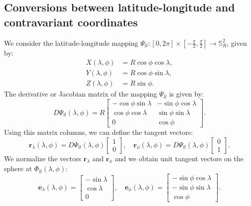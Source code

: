 \subsection{Conversions between latitude-longitude and contravariant coordinates}
\label{anexo-sph-ll}
We consider the latitude-longitude mapping 
$\Psi_{ll}: [0,2\pi] \times [-\frac{\pi}{2},\frac{\pi}{2}] \to \mathbb{S}^2_R$, given by:
\begin{align}
	\label{ll2sph}
	X(\lambda,\phi) &= R\cos \phi \cos \lambda,\\
	Y(\lambda,\phi) &= R\cos \phi \sin \lambda,\\
	Z(\lambda,\phi) &= R\sin \phi.
\end{align}
The derivative or Jacobian matrix of the mapping $\Psi_{ll}$ is given by:
\begin{equation}
	\label{dpsi}
	D\Psi_{ll} (\lambda,\phi) = 
	R \begin{bmatrix}
		  -\cos \phi \sin \lambda &  -\sin \phi \cos \lambda \\
		   \cos \phi \cos \lambda & \sin \phi \sin \lambda \\
		  0  &  \cos \phi
	\end{bmatrix}.
\end{equation}
Using this matrix columns, we can define the tangent vectors:
\begin{equation}
	\boldsymbol{r}_{\lambda}(\lambda,\phi) = D\Psi_{ll}(\lambda,\phi)
	\begin{bmatrix}
		 1 \\
		 0
	\end{bmatrix}, \quad
	\boldsymbol{r}_{\phi}(\lambda,\phi) = D\Psi_{ll}(\lambda,\phi)
	\begin{bmatrix}
		 0 \\
		 1
	\end{bmatrix}.
\end{equation}
We normalize the vectors $\boldsymbol{r}_\lambda$ and $\boldsymbol{r}_\phi$
and we obtain unit tangent vectors on the sphere at $\Phi_{ll}(\lambda, \phi)$:
\begin{equation}
	\label{latlon_tg_vectors}
	\boldsymbol{e}_{\lambda}(\lambda,\phi) = 
	\begin{bmatrix}
		 -\sin \lambda \\
		  \cos \lambda \\
		  0
	\end{bmatrix}, \quad
	\boldsymbol{e}_{\phi}(\lambda,\phi) =
	\begin{bmatrix}
		 -\sin \phi \cos \lambda \\
		 -\sin \phi \sin \lambda \\
			  \cos \phi
	\end{bmatrix}.
\end{equation}
